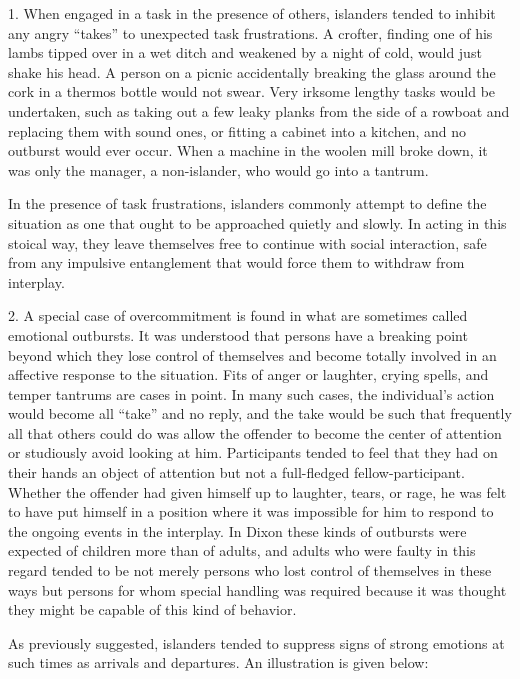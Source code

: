 \documentclass[openany,nobib]{tufte-book}
\begin{document}
1. When engaged in a task in the presence of others, islanders tended to
inhibit any angry ``takes'' to unexpected task frustrations. A crofter,
finding one of his lambs tipped over in a wet ditch and weakened by a
night of cold, would just shake his head. A person on a picnic
accidentally breaking the glass around the cork in a thermos bottle
would not swear. Very irksome lengthy tasks would be undertaken, such as
taking out a few leaky planks from the side of a rowboat and replacing
them with sound ones, or fitting a cabinet into a kitchen, and no
outburst would ever occur. When a machine in the woolen mill broke down,
it was only the manager, a non-islander, who would go into a tantrum.

In the presence of task frustrations, islanders commonly attempt to
define the situation as one that ought to be approached quietly and
slowly. In acting in this stoical way, they leave themselves free to
continue with social interaction, safe from any impulsive entanglement
that would force them to withdraw from interplay.

2. A special case of overcommitment is found in what are sometimes
called emotional outbursts. It was understood that persons have a
breaking point beyond which they lose control of themselves and become
totally involved in an affective response to the situation. Fits of
anger or laughter, crying spells, and temper tantrums are cases in
point. In many such cases, the individual's action would become all
``take'' and no reply, and the take would be such that frequently all
that others could do was allow the offender to become the center of
attention or studiously avoid looking at him. Participants tended to
feel that they had on their hands an object of attention but not a
full-fledged fellow-participant. Whether the offender had given himself
up to laughter, tears, or rage, he was felt to have put himself in a
position where it was impossible for him to respond to the ongoing
events in the interplay. In Dixon these kinds of outbursts were expected
of children more than of adults, and adults who were faulty in this
regard tended to be not merely persons who lost control of themselves in
these ways but persons for whom special handling was required because it
was thought they might be capable of this kind of behavior.

As previously suggested, islanders tended to suppress signs of strong
emotions at such times as arrivals and departures. An illustration is
given below:
\end{document}
